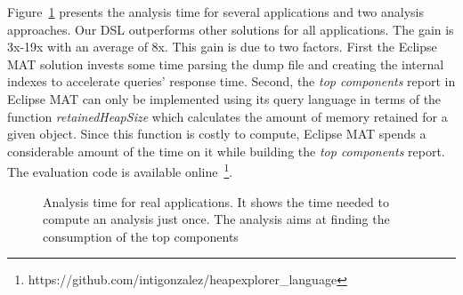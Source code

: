 Figure~\ref{fig:analysisTime} presents the analysis time for several applications and two analysis approaches.
Our DSL outperforms other solutions for all applications.
The gain is 3x-19x with an average of 8x.
This gain is due to two factors.
First the Eclipse MAT solution invests some time parsing the dump file and creating the internal indexes to accelerate queries' response time.
Second, the \textit{top components} report in Eclipse MAT can only be implemented using its query language in terms of the function \textit{retainedHeapSize} which calculates the amount of memory retained for a given object.
Since this function is costly to compute, Eclipse MAT spends a considerable amount of the time on it while building the \textit{top components} report. The evaluation code is available online~\footnote{https://github.com/intigonzalez/heapexplorer\_language}.

\begin{figure}[!ht]
\centering
{}
\caption{Analysis time for real applications. It shows the time needed to compute an analysis just once. The analysis aims at finding the consumption of the top components\label{fig:analysisTime}}
\end{figure}

